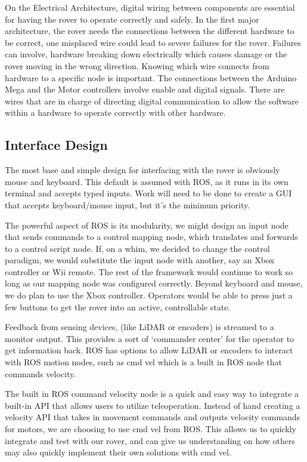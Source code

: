 \documentclass[a4paper, 10pt]{article}
\begin{document}
	On the Electrical Architecture, digital wiring between components are essential for having the rover to operate correctly and safely. In the first major architecture, the rover needs the connections between the different hardware to be correct, one misplaced wire could lead to severe failures for the rover. Failures can involve, hardware breaking down electrically which causes damage or the rover moving in the wrong direction. Knowing which wire connects from hardware to a specific node is important. The connections between the Arduino Mega and the Motor controllers involve enable and digital signals. There are wires that are in charge of directing digital communication to allow the software within a hardware to operate correctly with other hardware. 

	\subsection{Interface Design}
	The most base and simple design for interfacing with the rover is obviously mouse and keyboard. This default is assumed with ROS, as it runs in its own terminal and accepts typed inputs. Work will need to be done to create a GUI that accepts keyboard/mouse input, but it's the minimum priority.
	
	The powerful aspect of ROS is its modularity, we might design an input node that sends commands to a control mapping node, which translates and forwards to a control script node. If, on a whim, we decided to change the control paradigm, we would substitute the input node with another, say an Xbox controller or Wii remote. The rest of the framework would continue to work so long as our mapping node was configured correctly. Beyond keyboard and mouse, we do plan to use the Xbox controller. Operators would be able to press just a few buttons to get the rover into an active, controllable state.
	
	Feedback from sensing devices, (like LiDAR or encoders) is streamed to a monitor output. This provides a sort of `commander center' for the operator to get information back. ROS has options to allow LiDAR or encoders to interact with ROS motion nodes, such as cmd vel which is a built in ROS node that commands velocity. 

    The built in ROS command velocity node is a quick and easy way to integrate a built-in API that allows users to utilize teleoperation. Instead of hand creating a velocity API that takes in movement commands and outputs velocity commands for motors, we are choosing to use cmd vel from ROS. This allows us to quickly integrate and test with our rover, and can give us understanding on how others may also quickly implement their own solutions with cmd vel. 
\end{document}
